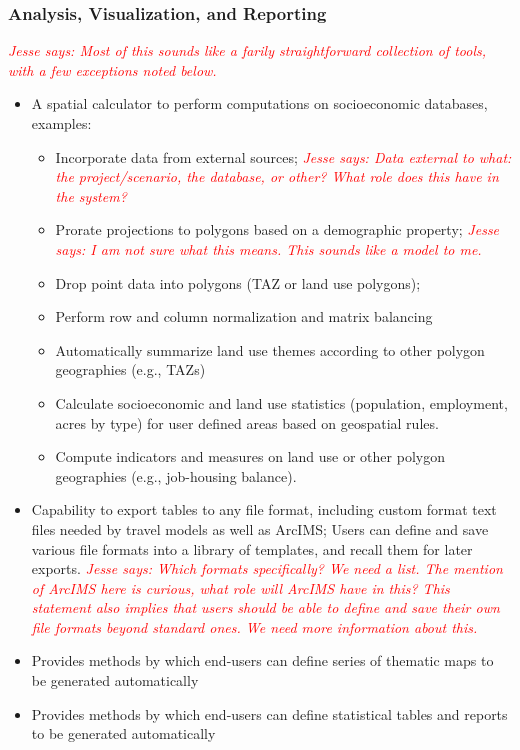 \documentclass[titlepage]{article}
\begin{document}
\subsubsection{Analysis, Visualization, and Reporting}
\textcolor{red}{\textit{Jesse says: Most of this sounds like a farily straightforward collection of tools, with a few exceptions noted below.}}
\begin{itemize}
	\item A spatial calculator to perform computations on socioeconomic databases, examples:
		\begin{itemize}
			\item Incorporate data from external sources;
				\textcolor{red}{\textit{Jesse says: Data external to what: the project/scenario, the database, or other?  What role does this have in the system?}}
			\item Prorate projections to polygons based on a demographic property;
				\textcolor{red}{\textit{Jesse says: I am not sure what this means.  This sounds like a model to me.}}
			\item Drop point data into polygons (TAZ or land use polygons);
			\item Perform row and column normalization and matrix balancing
			\item Automatically summarize land use themes according to other polygon geographies (e.g., TAZs)
			\item Calculate socioeconomic and land use statistics (population, employment, acres by type) for user defined areas based on geospatial rules.
			\item Compute indicators and measures on land use or other polygon geographies (e.g., job-housing balance).
		\end{itemize}
	\item Capability to export tables to any file format, including custom format text files needed by travel models as well as ArcIMS; Users can define and save various file formats into a library of templates, and recall them for later exports.
		\textcolor{red}{\textit{Jesse says: Which formats specifically?  We need a list.  The mention of ArcIMS here is curious, what role will ArcIMS have in this?  This statement also implies that users should be able to define and save their own file formats beyond standard ones.  We need more information about this.}}
	\item Provides methods by which end-users can define series of thematic maps to be generated automatically
	\item Provides methods by which end-users can define statistical tables and reports to be generated automatically
\end{itemize}
\end{document}
